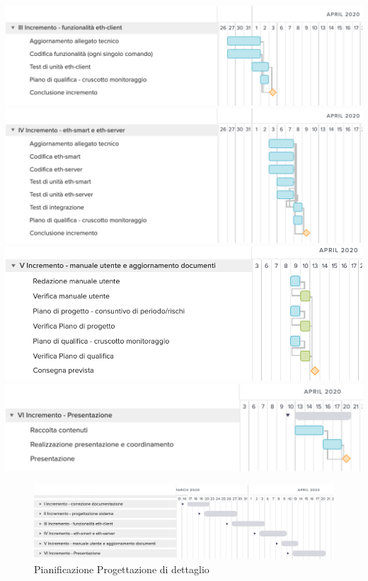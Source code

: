 	\includegraphics[width=\textwidth]{res/img/gantt/RQ/3}
	\includegraphics[width=\textwidth]{res/img/gantt/RQ/4}
	\includegraphics[width=\textwidth]{res/img/gantt/RQ/5}
	\includegraphics[width=\textwidth]{res/img/gantt/RQ/6}
\begin{figure}[h!]
	\includegraphics[width=\textwidth]{res/img/gantt/RQ/f}
	\caption{Pianificazione Progettazione di dettaglio}
\end{figure}
